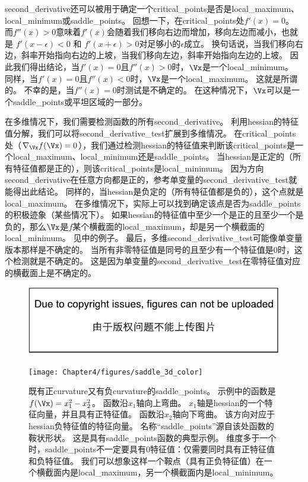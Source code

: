 \gls{second_derivative}还可以被用于确定一个\gls{critical_points}是否是\gls{local_maximum}、\gls{local_minimum}或\gls{saddle_points}。
回想一下，在\gls{critical_points}处$f'(x) = 0$。
而$f''(x) > 0$意味着$f'(x)$会随着我们移向右边而增加，移向左边而减小，也就是 $f'(x - \epsilon) < 0$ 和 $f'(x+\epsilon)>0$对足够小的$\epsilon$成立。 换句话说，当我们移向右边，斜率开始指向右边的上坡，当我们移向左边，斜率开始指向左边的上坡。
因此我们得出结论，当$f'(x) = 0$且$f''(x) > 0$时，$\Vx$是一个\gls{local_minimum}。
同样，当$f'(x) = 0$且$f''(x) < 0$时，$\Vx$是一个\gls{local_maximum}。
这就是所谓的。
不幸的是，当$f''(x) = 0$时测试是不确定的。
在这种情况下，$\Vx$可以是一个\gls{saddle_points}或平坦区域的一部分。


在多维情况下，我们需要检测函数的所有\gls{second_derivative}。
利用\gls{hessian}的特征值分解，我们可以将\gls{second_derivative_test}扩展到多维情况。
在\gls{critical_points}处（$\nabla_{\Vx} f(\Vx) = 0$），我们通过检测\gls{hessian}的特征值来判断该\gls{critical_points}是一个\gls{local_maximum}、\gls{local_minimum}还是\gls{saddle_points}。
当\gls{hessian}是正定的（所有特征值都是正的），则该\gls{critical_points}是\gls{local_minimum}。
因为方向\gls{second_derivative}在任意方向都是正的，参考单变量的\gls{second_derivative_test}就能得出此结论。
同样的，当\gls{hessian}是负定的（所有特征值都是负的），这个点就是\gls{local_maximum}。
在多维情况下，实际上可以找到确定该点是否为\gls{saddle_points}的积极迹象（某些情况下）。
如果\gls{hessian}的特征值中至少一个是正的且至少一个是负的，那么$\Vx$是$f$某个横截面的\gls{local_maximum}，却是另一个横截面的\gls{local_minimum}。
见中的例子。
最后，多维\gls{second_derivative_test}可能像单变量版本那样是不确定的。
当所有非零特征值是同号的且至少有一个特征值是$0$时，这个检测就是不确定的。
这是因为单变量的\gls{second_derivative_test}在零特征值对应的横截面上是不确定的。
\begin{figure}[!htb]
\ifOpenSource
\centerline{\includegraphics{figure.pdf}}
\else
\centerline{\texttt{[image: Chapter4/figures/saddle\_3d\_color]}}
\fi
\caption{既有正\gls{curvature}又有负\gls{curvature}的\gls{saddle_points}。
示例中的函数是$f(\Vx) = x_1^2 - x_2^2$。
函数沿$x_1$轴向上弯曲。
$x_1$轴是\gls{hessian}的一个特征向量，并且具有正特征值。
函数沿$x_2$轴向下弯曲。
该方向对应于\gls{hessian}负特征值的特征向量。
名称``\gls{saddle_points}''源自该处函数的鞍状形状。
这是具有\gls{saddle_points}函数的典型示例。
维度多于一个时，\gls{saddle_points}不一定要具有0特征值：仅需要同时具有正特征值和负特征值。
我们可以想象这样一个鞍点（具有正负特征值）在一个横截面内是\gls{local_maximum}，另一个横截面内是\gls{local_minimum}。
}
\label{fig:chap4_saddle_3d_color}
\end{figure}

